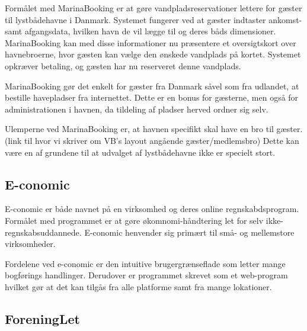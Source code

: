 Formålet med MarinaBooking \cite{marinabooking} er at gøre vandpladsreservationer lettere for gæster til lystbådehavne i Danmark. Systemet fungerer ved at gæster indtaster ankomst- samt afgangsdata, hvilken havn de vil lægge til og deres båds dimensioner. MarinaBooking kan med disse informationer nu præsentere et oversigtskort over havnebroerne, hvor gæsten kan vælge den ønskede vandplads på kortet. Systemet opkræver betaling, og gæsten har nu reserveret denne vandplads.

MarinaBooking gør det enkelt for gæster fra Danmark såvel som fra udlandet, at bestille havepladser fra internettet. Dette er en bonus for gæsterne, men også for administrationen i havnen, da tildeling af pladser herved ordner sig selv.

Ulemperne ved MarinaBooking er, at havnen specifikt skal have en bro til gæster. \sinote(link til hvor vi skriver om VB's layout angående gæster/medlemsbro) Dette kan være en af grundene til at udvalget af lystbådehavne ikke er specielt stort.


\subsection{E-conomic} %
\label{sub:E-conomic}

E-conomic er både navnet på en virksomhed og deres online regnskabdsprogram. Formålet med programmet er at gøre økomnomi-håndtering let for selv ikke-regnskabsuddannede. E-conomic henvender sig primært til små- og mellemstore virksomheder.

Fordelene ved e-conomic er den intuitive brugergrænseflade som letter mange bogførings handlinger. Derudover er programmet skrevet som et web-program hvilket gør at det kan tilgås fra alle platforme samt fra mange lokationer.


\subsection{ForeningLet} %
\label{sub:ForeningLet}


